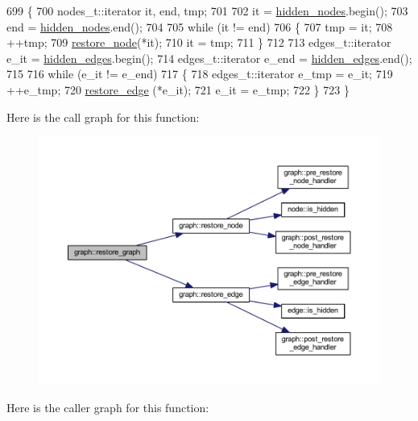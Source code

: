 \begin{DoxyCode}
699 \{
700     nodes\_t::iterator it, end, tmp;
701 
702     it = \mbox{\hyperlink{classgraph_a7a3f2842a409a4b35ca8ef34598df9ca}{hidden\_nodes}}.begin();
703     end = \mbox{\hyperlink{classgraph_a7a3f2842a409a4b35ca8ef34598df9ca}{hidden\_nodes}}.end();
704 
705     \textcolor{keywordflow}{while} (it != end)
706     \{
707         tmp = it;
708         ++tmp;
709         \mbox{\hyperlink{classgraph_ab57aab79e649cc275052b7decbdd03ec}{restore\_node}}(*it);
710         it = tmp;
711     \}
712 
713     edges\_t::iterator e\_it = \mbox{\hyperlink{classgraph_a0d3da33d047ba7cdc3dc68b5d9c84b88}{hidden\_edges}}.begin();
714     edges\_t::iterator e\_end = \mbox{\hyperlink{classgraph_a0d3da33d047ba7cdc3dc68b5d9c84b88}{hidden\_edges}}.end();
715 
716     \textcolor{keywordflow}{while} (e\_it != e\_end)
717     \{
718         edges\_t::iterator e\_tmp = e\_it;
719         ++e\_tmp;
720         \mbox{\hyperlink{classgraph_a2e5426682a0897b9f9104b019970bedc}{restore\_edge}} (*e\_it);
721         e\_it = e\_tmp;
722     \}
723 \}
\end{DoxyCode}
Here is the call graph for this function\+:
\nopagebreak
\begin{figure}[H]
\begin{center}
\leavevmode
\includegraphics[width=350pt]{classgraph_a53e2a5505fa6427587e12d66e4a86cec_cgraph}
\end{center}
\end{figure}
Here is the caller graph for this function\+:
\nopagebreak
